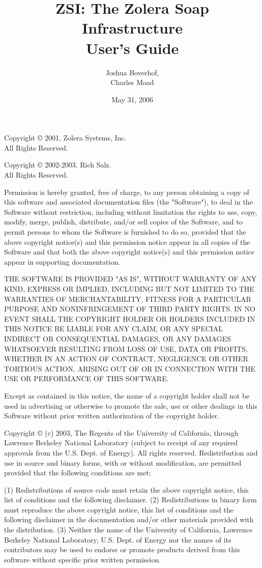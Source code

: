 \documentclass{manual}
\title{ZSI: The Zolera Soap Infrastructure \\
       User's Guide}
\author{Joshua Boverhof,\\
    Charles Moad}
\date{May 31, 2006}%
\begin{document}
\maketitle


\centerline{}

Copyright \copyright{} 2001, Zolera Systems, Inc.\\
All Rights Reserved.

Copyright \copyright{} 2002-2003, Rich Salz.\\
All Rights Reserved.

Permission is hereby granted, free of charge, to any person obtaining a
copy of this software and associated documentation files (the "Software"),
to deal in the Software without restriction, including without limitation
the rights to use, copy, modify, merge, publish, distribute, and/or
sell copies of the Software, and to permit persons to whom the Software
is furnished to do so, provided that the above copyright notice(s) and
this permission notice appear in all copies of the Software and that
both the above copyright notice(s) and this permission notice appear in
supporting documentation.

THE SOFTWARE IS PROVIDED "AS IS", WITHOUT WARRANTY OF ANY KIND,
EXPRESS OR IMPLIED, INCLUDING BUT NOT LIMITED TO THE WARRANTIES OF
MERCHANTABILITY, FITNESS FOR A PARTICULAR PURPOSE AND NONINFRINGEMENT
OF THIRD PARTY RIGHTS. IN NO EVENT SHALL THE COPYRIGHT HOLDER OR HOLDERS
INCLUDED IN THIS NOTICE BE LIABLE FOR ANY CLAIM, OR ANY SPECIAL INDIRECT
OR CONSEQUENTIAL DAMAGES, OR ANY DAMAGES WHATSOEVER RESULTING FROM LOSS
OF USE, DATA OR PROFITS, WHETHER IN AN ACTION OF CONTRACT, NEGLIGENCE
OR OTHER TORTIOUS ACTION, ARISING OUT OF OR IN CONNECTION WITH THE USE
OR PERFORMANCE OF THIS SOFTWARE.

Except as contained in this notice, the name of a copyright holder
shall not be used in advertising or otherwise to promote the sale, use
or other dealings in this Software without prior written authorization
of the copyright holder.

Copyright \copyright{} (c) 2003, The Regents of the University of California,
through Lawrence Berkeley National Laboratory (subject to receipt of
any required approvals from the U.S. Dept. of Energy). All rights
reserved. Redistribution and use in source and binary forms, with or
without modification, are permitted provided that the following
conditions are met:

(1) Redistributions of source code must retain the above copyright
notice, this list of conditions and the following disclaimer.
(2) Redistributions in binary form must reproduce the above copyright
notice, this list of conditions and the following disclaimer in the
documentation and/or other materials provided with the distribution.
(3) Neither the name of the University of California, Lawrence Berkeley
National Laboratory, U.S. Dept. of Energy nor the names of its contributors
may be used to endorse or promote products derived from this software without
specific prior written permission.
\end{document}
